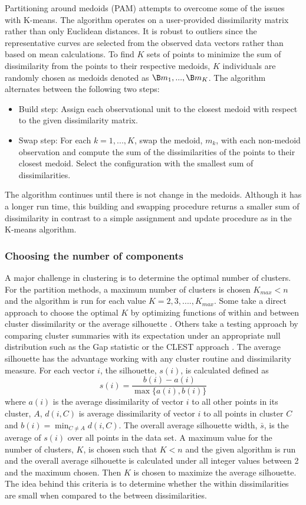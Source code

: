 Partitioning around medoids (PAM) attempts to overcome some of the issues with K-means. The algorithm operates on a user-provided dissimilarity matrix rather than only Euclidean distances. It is robust to outliers since the representative curves are selected from the observed data vectors rather than based on mean calculations. To find $K$ sets of points to minimize the sum of dissimilarity from the points to their respective medoids, $K$ individuals are randomly chosen as medoids denoted as $\B m_{1},...,\B m_{K}$. The algorithm alternates between the following two steps:
 \begin{itemize}
\item Build step: Assign each observational unit to the closest medoid with respect to the given dissimilarity matrix.
\item Swap step: For each $k=1,...,K$, swap the medoid, $m_{k}$, with each non-medoid observation and compute the sum of the dissimilarities of the points to their closest medoid. Select the configuration with the smallest sum of dissimilarities.
\end{itemize}
The algorithm continues until there is not change in the medoids. Although it has a longer run time, this building and swapping procedure returns a smaller sum of dissimilarity in contrast to a simple assignment and update procedure as in the K-means algorithm. 

\subsubsection{Choosing the number of components}
A major challenge in clustering is to determine the optimal number of clusters. For the partition methods, a maximum number of clusters is chosen $K_{max}<n$ and the algorithm is run for each value $K=2,3,....,K_{max}$. Some take a direct approach to choose the optimal $K$  by optimizing functions of within and between cluster dissimilarity \cite{mulligan1985} or the average silhouette \cite{kaufman1990}. Others take a testing approach by comparing cluster summaries with its expectation under an appropriate null distribution such as the Gap statistic \cite{tibshirani2001} or the CLEST approach \cite{dudoitfridlyand2002}. The average silhouette has the advantage working with any cluster routine and dissimilarity measure. For each vector $i$, the silhouette, $s(i)$, is calculated defined as
$$s(i)=\frac{b(i)-a(i)}{\max\{a(i),b(i)\}}$$
where $a(i)$ is the average dissimilarity of vector $i$ to all other points in its cluster, $A$, $d(i,C)$ is average dissimilarity of vector $i$ to all points in cluster $C$ and $b(i)=\min_{C\not= A} d(i,C)$. The overall average silhouette width, $\bar{s}$, is the average of $s(i)$ over all points in the data set. A maximum value for the number of clusters, $K$, is chosen such that $K<n$ and the given algorithm is run and the overall average silhouette is calculated under all integer values between 2 and the maximum chosen. Then $K$ is chosen to maximize the average silhouette. The idea behind this criteria is to determine whether the within dissimilarities are small when compared to the between dissimilarities. 



